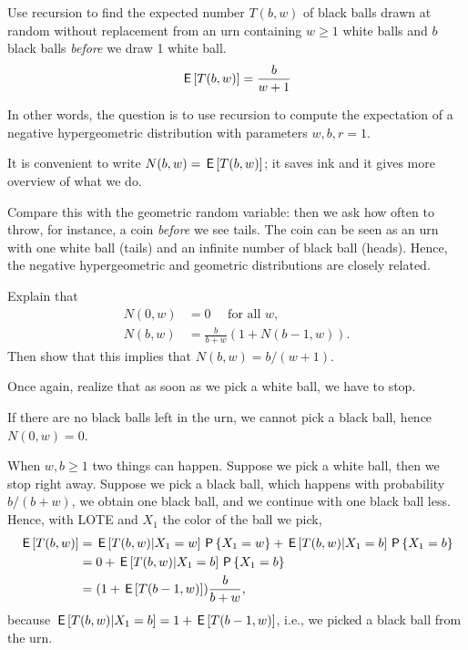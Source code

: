 \begin{exercise}
Use recursion to find the expected number $T(b,w)$ of black balls drawn at random without replacement from an urn containing $w\geq 1$ white balls and $b$ black balls \emph{before} we draw 1 white ball.
\begin{align}
  \label{eq:727}
\,\mathsf{E}\left[T(b,w)\right] = \frac{b}{w+1}
\end{align}

In other words, the question is to use recursion to compute  the expectation of a negative hypergeometric distribution with parameters $w,b, r=1$.

It is convenient to write $N(b,w) = \,\mathsf{E}\left[T(b,w)\right]$; it saves ink and it gives more overview of what we do.

Compare this with the geometric random variable: then we ask how often to throw, for instance, a coin \emph{before} we see tails.
The coin can be seen as an urn with one white ball (tails) and an infinite number of black ball (heads).
Hence, the negative hypergeometric and geometric distributions are closely related.

\begin{hint}
Explain that
\begin{align}
N(0, w) &= 0\quad \text{ for all $w$},\\
  N(b,w) &= \frac{b}{b+w} (1+N(b-1, w)).
\end{align}
Then show that this implies that $N(b,w) = b/ (w+1)$.
\end{hint}
\begin{solution}
Once again, realize that as soon as we pick a white ball, we have to stop.

If there are no black balls left in the urn,  we cannot pick a black ball, hence $N(0,w) = 0$.

When $w, b \geq 1$ two things can happen.
Suppose we pick a white ball, then we stop right away.
Suppose we pick a black ball, which happens with probability $b/(b+w)$, we obtain one black ball, and we continue with one black ball less.
Hence, with LOTE and $X_{1}$ the color of the ball we pick,
\begin{align}
\,\mathsf{E}\left[T(b,w)\right]
  &= \,\mathsf{E}\left[T(b,w) | X_1 = w\right] \,\mathsf{P}\left\{X_1=w\right\} + \,\mathsf{E}\left[T(b,w)|X_1=b\right] \,\mathsf{P}\left\{X_1=b\right\}   \\
  &= 0 + \,\mathsf{E}\left[T(b,w)|X_1=b\right] \,\mathsf{P}\left\{X_1=b\right\} \\
  &= (1+\,\mathsf{E}\left[T(b-1, w)\right]) \frac{b}{b+w},
\end{align}
because $\,\mathsf{E}\left[T(b, w) |X_1=b\right] = 1 + \,\mathsf{E}\left[T(b-1,w)\right]$, i.e., we picked a black ball from the urn.


\end{solution}
\end{exercise}
